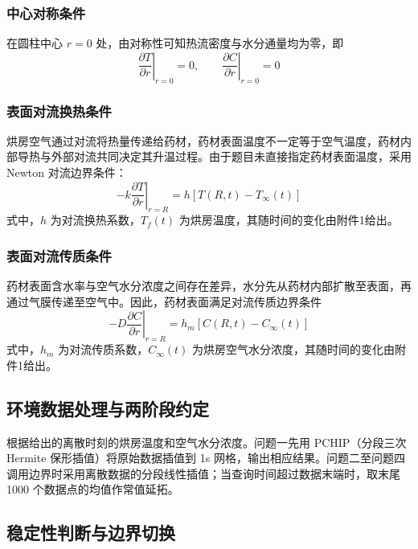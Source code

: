 \documentclass[withoutpreface,bwprint]{cumcm_thesis}
\begin{document}
\subsubsection{中心对称条件}

在圆柱中心 \(r=0\) 处，由对称性可知热流密度与水分通量均为零，即
\begin{equation}
\left. \frac{\partial T}{\partial r} \right|_{r=0} = 0, \qquad \left. \frac{\partial C}{\partial r} \right|_{r=0} = 0
\end{equation}

\subsubsection{表面对流换热条件}

烘房空气通过对流将热量传递给药材，药材表面温度不一定等于空气温度，药材内部导热与外部对流共同决定其升温过程。由于题目未直接指定药材表面温度，采用 Newton 对流边界条件：
\begin{equation}
-k \left. \frac{\partial T}{\partial r} \right|_{r=R} = h \left[ T(R,t) - T_\infty(t) \right]
\end{equation}
式中，\(h\) 为对流换热系数，\(T_f(t)\) 为烘房温度，其随时间的变化由附件1给出。

\subsubsection{表面对流传质条件}

药材表面含水率与空气水分浓度之间存在差异，水分先从药材内部扩散至表面，再通过气膜传递至空气中。因此，药材表面满足对流传质边界条件
\begin{equation}
-D \left. \frac{\partial C}{\partial r} \right|_{r=R} = h_m \left[ C(R,t) - C_\infty(t) \right]
\end{equation}
式中，\(h_m\) 为对流传质系数，\(C_\infty(t)\) 为烘房空气水分浓度，其随时间的变化由附件1给出。


\subsection{环境数据处理与两阶段约定}

根据给出的离散时刻的烘房温度和空气水分浓度。问题一先用 PCHIP（分段三次 Hermite 保形插值）将原始数据插值到 1s 网格，输出相应结果。问题二至问题四调用边界时采用离散数据的分段线性插值；当查询时间超过数据末端时，取末尾 1000 个数据点的均值作常值延拓。

\subsection{稳定性判断与边界切换}
\end{document}
